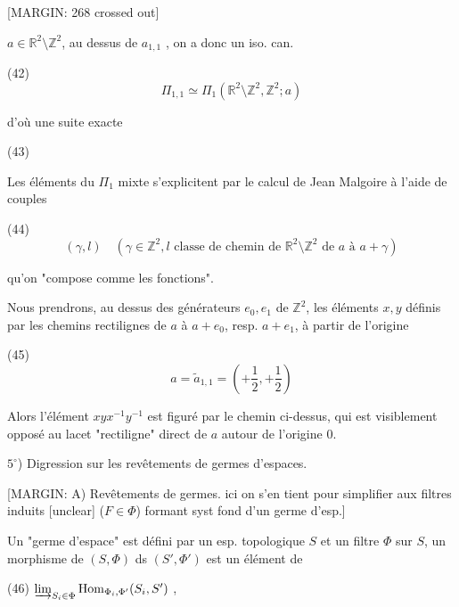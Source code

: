 \newpage


[MARGIN: 268 crossed out]

$a \in \mathbb{R}^2 \setminus \mathbb{Z}^2$,
au dessus de $a_{1,1}$ , on a donc un iso. can.

(42) $$ \Pi_{1,1} \simeq \Pi_1(\mathbb{R}^2 \setminus \mathbb{Z}^2, \mathbb{Z}^2; a) $$

d'où une suite exacte

(43)

Les éléments du $\Pi_1$ mixte s'explicitent par le calcul de Jean Malgoire à l'aide de couples

(44) $$ (\gamma, l) \quad (\gamma \in \mathbb{Z}^2, l \text{ classe de chemin de } \mathbb{R}^2 \setminus \mathbb{Z}^2 \text{ de } a \text{ à } a+\gamma) $$

qu'on "compose comme les fonctions".

Nous prendrons, au dessus des générateurs $e_0, e_1$ de $\mathbb{Z}^2$, les éléments $x, y$ définis par les chemins rectilignes de $a$ à $a+e_0$, resp. $a+e_1$, à partir de l'origine

(45) $$ a = \tilde{a}_{1,1} = (+\frac{1}{2}, +\frac{1}{2}) $$

Alors l'élément $xyx^{-1}y^{-1}$ est figuré par le chemin ci-dessus, qui est visiblement opposé au lacet "rectiligne" direct de $a$ autour de l'origine $0$.

\newpage


$5^\circ$) Digression sur les revêtements de germes d'espaces.

[MARGIN: A) Revêtements de germes. ici on s'en tient pour simplifier aux filtres induits [unclear] ($F \in \Phi$) formant syst fond d'un germe d'esp.]

Un "germe d'espace" est défini par un esp. topologique $S$ et un filtre $\Phi$ sur $S$, un morphisme de $(S,\Phi)$ ds $(S',\Phi')$ est un élément de

(46) $\varinjlim_{S_i \in \Phi} \operatorname{Hom}_{\Phi_i, \Phi'} (S_i, S')$ ,

